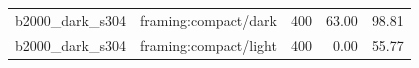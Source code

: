 \begin{longtable}{l>{\raggedright\arraybackslash}p{.42\linewidth}rrr}
b2000\_\allowbreak{}dark\_\allowbreak{}s304 & %
framing:compact/dark & %
400 & %
63.00 & %
98.81 \\ %

b2000\_\allowbreak{}dark\_\allowbreak{}s304 & %
framing:compact/light & %
400 & %
0.00 & %
55.77 \\ %


\end{longtable}
